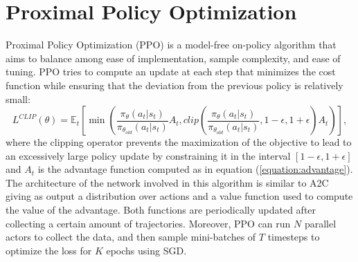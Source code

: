 \section{Proximal Policy Optimization}
Proximal Policy Optimization (PPO) \cite{schulman2017proximal} is a model-free on-policy algorithm that aims to balance among ease of implementation, sample complexity, and ease of tuning. PPO tries to compute an update at each step that minimizes the cost function while ensuring that the deviation from the previous policy is relatively small:
\begin{equation} \label{equation:PPO}
L^{CLIP}(\theta)=\mathbb{E}_t[\min(\frac{\pi_\theta(a_t|s_t)}{\pi_{\theta_{old}}(a_t|s_t)}A_t,clip(\frac{\pi_\theta(a_t|s_t)}{\pi_{\theta_{old}}(a_t|s_t)},1-\epsilon,1+\epsilon)A_t)],
\end{equation}
where the clipping operator prevents the maximization of the objective to lead to an excessively large policy update by constraining it in the interval \([1-\epsilon,1+\epsilon]\) and \(A_t\) is the advantage function computed as in equation (\ref{equation:advantage}). The architecture of the network involved in this algorithm is similar to A2C giving as output a distribution over actions and a value function used to compute the value of the advantage. Both functions are periodically updated after collecting a certain amount of trajectories. Moreover, PPO can run \(N\) parallel actors to collect the data, and then sample mini-batches of \(T\) timesteps to optimize the loss for \(K\) epochs using SGD.